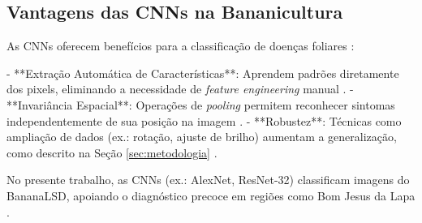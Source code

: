 \subsection{Vantagens das CNNs na Bananicultura}
\label{subsec:vantagens-cnns}

As CNNs oferecem benefícios para a classificação de doenças foliares \cite{LeCun2015}:

- **Extração Automática de Características**: Aprendem padrões diretamente dos pixels, eliminando a necessidade de \textit{feature engineering} manual \cite{RezendeTese}.
- **Invariância Espacial**: Operações de \textit{pooling} permitem reconhecer sintomas independentemente de sua posição na imagem \cite{Goodfellow2016}.
- **Robustez**: Técnicas como ampliação de dados (ex.: rotação, ajuste de brilho) aumentam a generalização, como descrito na Seção \ref{sec:metodologia} \cite{Leite2022}.

No presente trabalho, as CNNs (ex.: AlexNet, ResNet-32) classificam imagens do BananaLSD, apoiando o diagnóstico precoce em regiões como Bom Jesus da Lapa \cite{Silva2024}.


